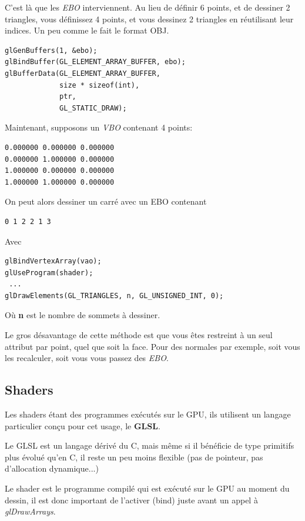\documentclass[pdftex, 11pt, a4paper, titlepage]{article}
\begin{document}
C'est là que les \emph{EBO} interviennent. Au lieu de définir 6 points, et de
dessiner 2 triangles, vous définissez 4 points, et vous dessinez 2
triangles en réutilisant leur indices. Un peu comme le fait le format
OBJ.

\begin{lstlisting}
glGenBuffers(1, &ebo);
glBindBuffer(GL_ELEMENT_ARRAY_BUFFER, ebo);
glBufferData(GL_ELEMENT_ARRAY_BUFFER,
             size * sizeof(int),
             ptr,
             GL_STATIC_DRAW);
\end{lstlisting}

Maintenant, supposons un \emph{VBO} contenant 4 points:
\begin{verbatim}
0.000000 0.000000 0.000000
0.000000 1.000000 0.000000
1.000000 0.000000 0.000000
1.000000 1.000000 0.000000
\end{verbatim}

On peut alors dessiner un carré avec un EBO contenant

\begin{verbatim}
0 1 2 2 1 3
\end{verbatim}

Avec
\begin{lstlisting}
glBindVertexArray(vao);
glUseProgram(shader);
 ...
glDrawElements(GL_TRIANGLES, n, GL_UNSIGNED_INT, 0);
\end{lstlisting}

Où \textbf{n} est le nombre de sommets à dessiner.

Le gros désavantage de cette méthode est que vous êtes restreint à un
seul attribut par point, quel que soit la face. Pour des normales par
exemple, soit vous les recalculer, soit vous vous passez des \emph{EBO}.

\pagebreak

\subsection{Shaders}

Les shaders étant des programmes exécutés sur le GPU, ils utilisent un
langage particulier conçu pour cet usage, le \textbf{GLSL}.

Le GLSL est un langage dérivé du C, mais même si il bénéficie de type
primitifs plus évolué qu'en C, il reste un peu moins flexible (pas de
pointeur, pas d'allocation dynamique...)

Le shader est le programme compilé qui est exécuté sur le GPU au
moment du dessin, il est donc important de l'activer (bind) juste
avant un appel à \emph{glDrawArrays}.
\end{document}
